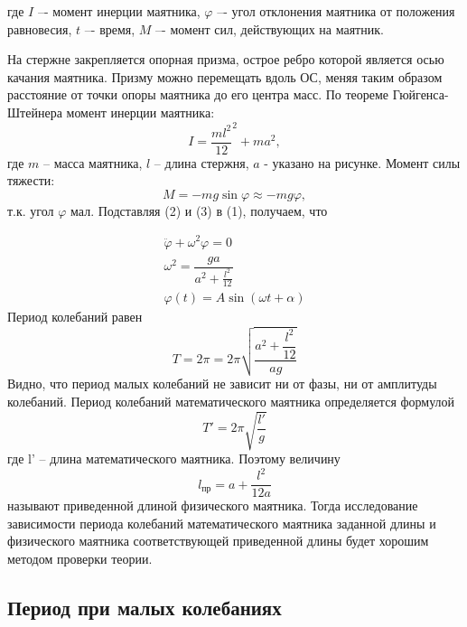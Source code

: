\documentclass[a4paper, 10pt]{article}%
\begin{document}
где $I$ –- момент инерции маятника, $ \varphi $ –- угол отклонения маятника от положения равновесия, $t$ –- время, $M$ –- момент сил, действующих на маятник.

На стержне закрепляется опорная призма, острое ребро которой является осью качания маятника.
Призму можно перемещать вдоль ОС, меняя таким образом расстояние от точки опоры маятника до его центра масс.
По теореме Гюйгенса-Штейнера момент инерции маятника: 
\begin{equation}
I =\frac{ml^2}{12}^2+ma^2,
\end{equation}
где $m$ -- масса маятника, $l$ -- длина стержня, $a$ - указано на рисунке.
Момент силы тяжести:
\begin{equation}
M=-mg\sin\varphi\approx-mg\varphi,
\end{equation}
т.к. угол $\varphi$ мал.
Подставляя (2) и (3) в (1), получаем, что 

\begin{equation}
\begin{aligned}
\ddot{\varphi}+\omega^2\varphi=0 \\
\omega^2=\dfrac{ga}{a^2+ \frac{l^2}{12}} \\
\varphi(t)=A\sin(\omega t+\alpha)
\end{aligned}
\end{equation}
Период колебаний равен 
\begin{equation}
T=2\pi=2\pi\sqrt{\dfrac{a^{2}+\dfrac{l^{2}}{12}}{ag}}
\end{equation}
Видно, что период малых колебаний не зависит ни от фазы, ни от амплитуды колебаний. Период колебаний математического маятника определяется формулой
\[T'=2\pi\sqrt{\dfrac{l'}{g}}\]
где l' -- длина математического маятника. Поэтому величину
\begin{equation}
l_{\text{пр}}=a+\dfrac{l^{2}}{12a}
\end{equation}
называют приведенной длиной физического маятника. Тогда исследование зависимости периода колебаний математического маятника заданной длины и физического маятника соответствующей приведенной длины будет хорошим методом проверки теории.
\subsection*{Период при малых колебаниях}
\end{document}
